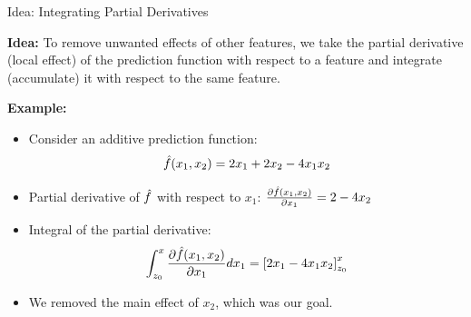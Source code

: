 \documentclass[11pt,compress,t,notes=noshow, xcolor=table]{beamer}
\begin{document}
\begin{vbframe}{Idea: Integrating Partial Derivatives}

\textbf{Idea:} To remove unwanted effects of other features, we take the partial derivative (local effect) of the prediction function with respect to a feature and integrate (accumulate) it with respect to the same feature.

\lz

\textbf{Example:}
\begin{itemize}
\item Consider an additive prediction function: $$\fh(x_1, x_2) = 2x_1 + 2x_2 - 4x_1 x_2$$
\item Partial derivative of $\fh$ with respect to $x_1$:
$\frac{\partial \fh(x_1, x_2)}{\partial x_1} = 2 - 4x_2$
\item Integral of the partial derivative:
$$\int_{z_0}^{x} \frac{\partial \fh(x_1, x_2)}{\partial x_1} dx_1 = \left[2x_1 - 4x_1 x_2\right]_{z_0}^{x}$$
\item We removed the main effect of $x_2$, which was our goal.
\end{itemize}
\end{vbframe}
\end{document}
